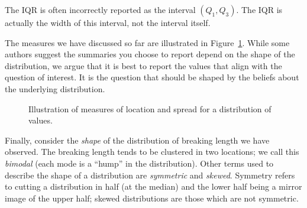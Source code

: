 \documentclass[
  letterpaper,
  DIV=11,
  numbers=noendperiod]{scrreprt}
\theoremstyle{plain}
\theoremstyle{definition}
\theoremstyle{definition}
\theoremstyle{remark}
\begin{document}
\begin{tcolorbox}[enhanced jigsaw, breakable, titlerule=0mm, colframe=quarto-callout-note-color-frame, bottomtitle=1mm, opacityback=0, rightrule=.15mm, toptitle=1mm, arc=.35mm, bottomrule=.15mm, left=2mm, title=\textcolor{quarto-callout-note-color}{\faInfo}\hspace{0.5em}{Note}, leftrule=.75mm, coltitle=black, toprule=.15mm, colbacktitle=quarto-callout-note-color!10!white, colback=white, opacitybacktitle=0.6]

The IQR is often incorrectly reported as the interval
\(\left(Q_1, Q_3\right)\). The IQR is actually the width of this
interval, not the interval itself.

\end{tcolorbox}

The measures we have discussed so far are illustrated in
Figure~\ref{fig-summaries-summaries}. While some authors suggest the
summaries you choose to report depend on the shape of the distribution,
we argue that it is best to report the values that align with the
question of interest. It is the question that should be shaped by the
beliefs about the underlying distribution.

\begin{figure}


\caption{\label{fig-summaries-summaries}Illustration of measures of
location and spread for a distribution of values.}

\end{figure}%

Finally, consider the \emph{shape} of the distribution of breaking
length we have observed. The breaking length tends to be clustered in
two locations; we call this \emph{bimodal} (each mode is a ``hump'' in
the distribution). Other terms used to describe the shape of a
distribution are \emph{symmetric} and \emph{skewed}. Symmetry refers to
cutting a distribution in half (at the median) and the lower half being
a mirror image of the upper half; skewed distributions are those which
are not symmetric.
\end{document}

